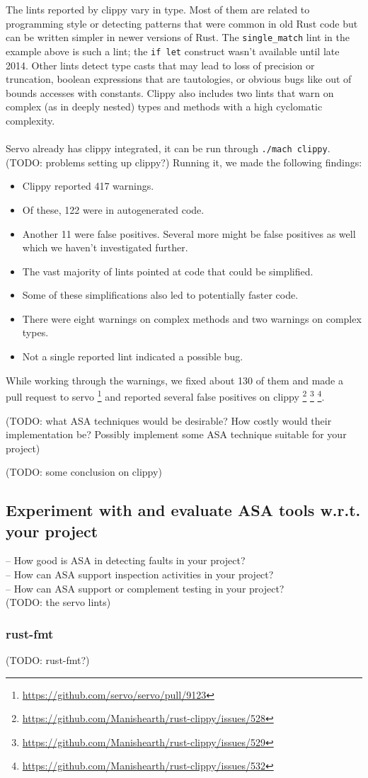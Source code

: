 \documentclass{scrartcl}
\newcommand{\todo}[1] {{\color{red}(TODO: #1)}}
\begin{document}
The lints reported by clippy vary in type. Most of them are related to programming style or detecting patterns that were common in old Rust code but can be written simpler in newer versions of Rust. The \texttt{single\_match} lint in the example above is such a lint; the \texttt{if let} construct wasn't available until late 2014. Other lints detect type casts that may lead to loss of precision or truncation, boolean expressions that are tautologies, or obvious bugs like out of bounds accesses with constants. Clippy also includes two lints that warn on complex (as in deeply nested) types and methods with a high cyclomatic complexity.\\
\\
Servo already has clippy integrated, it can be run through \texttt{./mach clippy}. \todo{problems setting up clippy?} Running it, we made the following findings: 
\begin{itemize}
	\item Clippy reported 417 warnings.
    \item Of these, 122 were in autogenerated code.
    \item Another 11 were false positives. Several more might be false positives as well which we haven't investigated further.
    \item The vast majority of lints pointed at code that could be simplified.
    \item Some of these simplifications also led to potentially faster code.
    \item There were eight warnings on complex methods and two warnings on complex types.
    \item Not a single reported lint indicated a possible bug.
\end{itemize}

While working through the warnings, we fixed about 130 of them and made a pull request to servo \footnote{\url{https://github.com/servo/servo/pull/9123}} and reported several false positives on clippy \footnote{\url{https://github.com/Manishearth/rust-clippy/issues/528}} \footnote{\url{https://github.com/Manishearth/rust-clippy/issues/529}} \footnote{\url{https://github.com/Manishearth/rust-clippy/issues/532}}.


\todo{what ASA techniques would be desirable? How costly would their implementation be? Possibly implement some ASA technique suitable for your project}

\todo{some conclusion on clippy}
\subsection*{Experiment with and evaluate ASA tools w.r.t. your project}
– How good is ASA in detecting faults in your project?\\
– How can ASA support inspection activities in your project? \\
– How can ASA support or complement testing in your project? \\

\todo{the servo lints}

\subsubsection{rust-fmt}
\todo{rust-fmt?}
\end{document}

